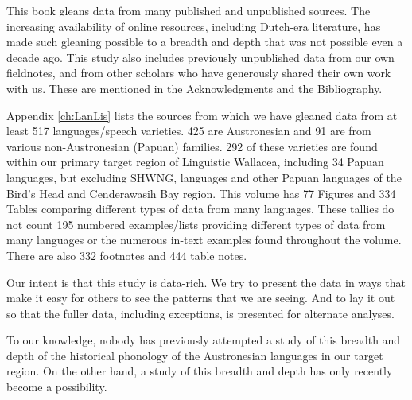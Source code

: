 This book gleans data from many published
and unpublished sources.
The increasing availability of online resources,
including Dutch-era literature,
has made such gleaning possible to a breadth
and depth that was not possible even a decade ago.
This study also includes previously unpublished data from our own fieldnotes,
and from other scholars who have generously shared their own work with us.
These are mentioned in the Acknowledgments
and the Bibliography.

Appendix \ref{ch:LanLis} lists the sources from which we have gleaned
data from at least 517 languages/speech varieties.
425 are Austronesian
and 91 are from various non-Austronesian (Papuan) families.
292 of these varieties are found within our
primary target region of Linguistic Wallacea,
including 34 Papuan  languages,
but excluding SHWNG,
 languages
and other Papuan languages of the Bird’s Head
and Cenderawasih Bay region.
This volume has 77 Figures
and 334 Tables comparing different types of data from many languages.
These tallies do not count 195 numbered examples/lists
providing different types of data from many
languages or the numerous in-text examples found throughout the volume.
There are also 332 footnotes
and 444 table notes.

Our intent is that this study is data-rich.
We try to present the data in ways that make it easy for others to see the patterns that we are seeing.
And to lay it out so that the fuller data,
including exceptions, is presented for alternate analyses.

To our knowledge,
nobody has previously attempted a study of this breadth
and depth of the historical phonology of the Austronesian languages in our target region.
On the other hand,
a study of this breadth
and depth has only recently become a possibility.